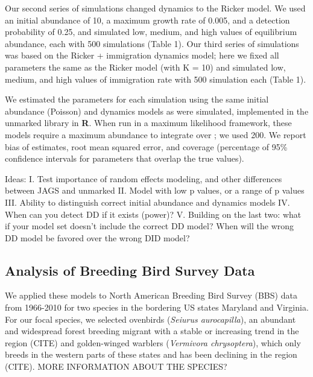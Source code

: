 \documentclass[12pt]{article}
\begin{document}
Our second series of simulations changed dynamics to the
Ricker model.  We used an initial abundance of 10, a maximum
growth rate of 0.005, and a detection probability of 0.25, and
simulated low, medium, and high values of equilibrium
abundance, each with 500 simulations (Table 1).  Our third
series of simulations was based on the Ricker + immigration
dynamics model; here we fixed all parameters the same as the
Ricker model (with K = 10) and simulated low, medium, and high
values of immigration rate with 500 simulation each (Table
1).

We estimated the parameters for each simulation using the same
initial abundance (Poisson) and dynamics models as were
simulated, implemented in the unmarked library in \textbf{R}.  When run
in a maximum likelihood framework, these models require a
maximum abundance to integrate over
\citep{royle:2004biom,dail_madsen:2011};
we used 200.  We report bias of estimates, root
mean squared error, and coverage (percentage of 95\% confidence
intervals for parameters that
overlap the true values).

Ideas:
I.	Test importance of random effects modeling, and other differences between JAGS and unmarked
II.	Model with low p values, or a range of p values
III.	Ability to distinguish correct initial abundance and dynamics models
IV.	When can you detect DD if it exists (power)?
V.	Building on the last two: what if your model set doesn't
include the correct DD model?  When will the wrong DD model be favored
over the wrong DID model?



\subsection{Analysis of Breeding Bird Survey Data}

We applied these models to North American Breeding Bird Survey (BBS)
data from 1966-2010 for two species in the bordering US states
Maryland and Virginia.  For our focal species, we selected ovenbirds
(\textit{Seiurus aurocapilla}), an abundant and widespread forest breeding
migrant with a stable or increasing trend in the region (CITE) and
golden-winged warblers (\textit{Vermivora chrysoptera}), which only breeds in
the western parts of these states and has been declining in the region
(CITE).  MORE INFORMATION ABOUT THE SPECIES?
\end{document}
